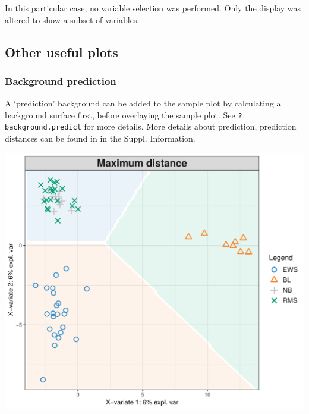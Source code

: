 \documentclass[]{book}
\newenvironment{Shaded}{\begin{snugshade}}{\end{snugshade}}
\newcommand{\DataTypeTok}[1]{\textcolor[rgb]{0.13,0.29,0.53}{#1}}
\newcommand{\DecValTok}[1]{\textcolor[rgb]{0.00,0.00,0.81}{#1}}
\newcommand{\KeywordTok}[1]{\textcolor[rgb]{0.13,0.29,0.53}{\textbf{#1}}}
\newcommand{\NormalTok}[1]{#1}
\newcommand{\OperatorTok}[1]{\textcolor[rgb]{0.81,0.36,0.00}{\textbf{#1}}}
\newcommand{\OtherTok}[1]{\textcolor[rgb]{0.56,0.35,0.01}{#1}}
\newcommand{\StringTok}[1]{\textcolor[rgb]{0.31,0.60,0.02}{#1}}
\begin{document}
In this particular case, no variable selection was performed. Only the display was altered to show a subset of variables.

\hypertarget{other-useful-plots-1}{%
\subsection{Other useful plots}\label{other-useful-plots-1}}

\hypertarget{background-prediction}{%
\subsubsection{Background prediction}\label{background-prediction}}

A `prediction' background can be added to the sample plot by calculating a background surface first, before overlaying the sample plot. See \texttt{?background.predict} for more details. More details about prediction, prediction distances can be found in \citep{mixomics} in the Suppl. Information.

\begin{Shaded}
\end{Shaded}

\begin{center}\includegraphics[width=0.5\linewidth]{Figures/04-plsda-background-1} \end{center}
\end{document}
